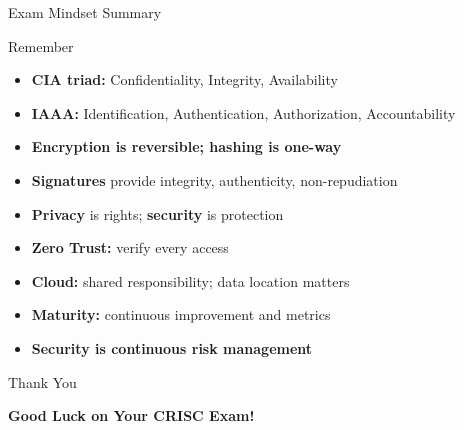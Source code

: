 \documentclass{beamer}
\begin{document}
	\begin{frame}{Exam Mindset Summary}
		\begin{block}{Remember}
			\begin{itemize}
				\item \textbf{CIA triad:} Confidentiality, Integrity, Availability
				\item \textbf{IAAA:} Identification, Authentication, Authorization, Accountability
				\item \textbf{Encryption is reversible; hashing is one-way}
				\item \textbf{Signatures} provide integrity, authenticity, non-repudiation
				\item \textbf{Privacy} is rights; \textbf{security} is protection
				\item \textbf{Zero Trust:} verify every access
				\item \textbf{Cloud:} shared responsibility; data location matters
				\item \textbf{Maturity:} continuous improvement and metrics
				\item \textbf{Security is continuous risk management}
			\end{itemize}
		\end{block}
	\end{frame}
	
	\begin{frame}{Thank You}
		\begin{center}
			{\Huge \textbf{Good Luck on Your CRISC Exam!}}
		\end{center}
	\end{frame}
	
\end{document}
